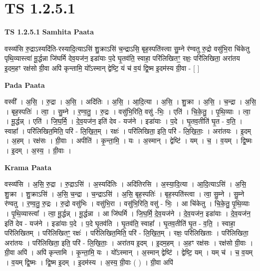\documentclass[17pt]{extarticle}
\begin{document}
\section*{ TS 1.2.5.1 }

\textbf{TS 1.2.5.1 } \newline
\textbf{Samhita Paata} \newline

वस्व्य॑सि रु॒द्राऽस्यदि॑ति-रस्यादि॒त्याऽसि॑ शु॒क्राऽसि॑ च॒न्द्राऽसि॒ बृह॒स्पति॑स्त्वा सु॒म्ने र॑ण्वतु रु॒द्रो वसु॑भि॒रा चि॑केतु पृथि॒व्यास्त्वा॑ मू॒र्द्धन्ना जि॑घर्मि देव॒यज॑न॒ इडा॑याः प॒दे घृ॒तव॑ति॒ स्वाहा॒ परि॑लिखितꣳ॒॒ रक्षः॒ परि॑लिखिता॒ अरा॑तय इ॒दम॒हꣳ रक्ष॑सो ग्री॒वा अपि॑ कृन्तामि॒ यो᳚ऽस्मान् द्वेष्टि॒ यं च॑ व॒यं द्वि॒ष्म इ॒दम॑स्य ग्री॒वा - [ ] \newline

\textbf{Pada Paata} \newline

वस्वी᳚ । अ॒सि॒ । रु॒द्रा । अ॒सि॒ । अदि॑तिः । अ॒सि॒ । आ॒दि॒त्या । अ॒सि॒ । शु॒क्रा । अ॒सि॒ । च॒न्द्रा । अ॒सि॒ । बृह॒स्पतिः॑ । त्वा॒ । सु॒म्ने । र॒ण्व॒तु॒ । रु॒द्रः । वसु॑भि॒रिति॒ वसु॑ -भिः॒ । एति॑ । चि॒के॒तु॒ । पृ॒थि॒व्याः । त्वा॒ । मू॒र्द्धन्न् । एति॑ । जि॒घ॒र्मि॒ । दे॒व॒यज॑न॒ इति॑ देव - यज॑ने । इडा॑याः । प॒दे । घृ॒तव॒तीति॑ घृ॒त - व॒ति॒ । स्वाहा᳚ । परि॑लिखित॒मिति॒ परि॑ - लि॒खि॒त॒म् । रक्षः॑ । परि॑लिखिता॒ इति॒ परि॑ - लि॒खि॒ताः॒ । अरा॑तयः । इ॒दम् । अ॒हम् । रक्ष॑सः । ग्री॒वाः । अपीति॑ । कृ॒न्ता॒मि॒ । यः । अ॒स्मान् । द्वेष्टि॑ । यम् । च॒ । व॒यम् । द्वि॒ष्मः । इ॒दम् । अ॒स्य॒ । ग्री॒वाः ।  \newline


\textbf{Krama Paata} \newline

वस्व्य॑सि । अ॒सि॒ रु॒द्रा । रु॒द्राऽसि॑ । अ॒स्यदि॑तिः । अदि॑तिरसि । अ॒स्या॒दि॒त्या । आ॒दि॒त्याऽसि॑ । अ॒सि॒ शु॒क्रा । शु॒क्राऽसि॑ । अ॒सि॒ च॒न्द्रा । च॒न्द्राऽसि॑ । अ॒सि॒ बृह॒स्पतिः॑ । बृह॒स्पति॑स्त्वा । त्वा॒ सु॒म्ने । सु॒म्ने र॑ण्वतु । र॒ण्व॒तु॒ रु॒द्रः । रु॒द्रो वसु॑भिः । वसु॑भि॒रा । वसु॑भि॒रिति॒ वसु॑ - भिः॒ । आ चि॑केतु । चि॒के॒तु॒ पृ॒थि॒व्याः । पृ॒थि॒व्यास्त्वा᳚ । त्वा॒ मू॒र्द्धन्न् । मू॒र्द्धन्ना । आ जि॑घर्मि । जि॒घ॒र्मि॒ दे॒व॒यज॑ने । दे॒व॒यज॑न॒ इडा॑याः । दे॒व॒यज॑न॒ इति॑ देव - यज॑ने । इडा॑याः प॒दे । प॒दे घृ॒तव॑ति । घृ॒तव॑ति॒ स्वाहा᳚ । घृ॒तव॒तीति॑ घृ॒त - व॒ति॒ । स्वाहा॒ परि॑लिखितम् । परि॑लिखितꣳ॒॒ रक्षः॑ । परि॑लिखित॒मिति॒ परि॑ - लि॒खि॒त॒म् । रक्षः॒ परि॑लिखिताः । परि॑लिखिता॒ अरा॑तयः । परि॑लिखिता॒ इति॒ परि॑ - लि॒खि॒ताः॒ । अरा॑तय इ॒दम् । इ॒दम॒हम् । अ॒हꣳ रक्ष॑सः । रक्ष॑सो ग्री॒वाः । ग्री॒वा अपि॑ । अपि॑ कृन्तामि । कृ॒न्ता॒मि॒ यः । यो᳚ऽस्मान् । अ॒स्मान् द्वेष्टि॑ । द्वेष्टि॒ यम् । यम् च॑ । च॒ व॒यम् । व॒यम् द्वि॒ष्मः । द्वि॒ष्म इ॒दम् । इ॒दम॑स्य । अ॒स्य॒ ग्री॒वाः ( ) । ग्री॒वा अपि॑ \newline
\end{document}
